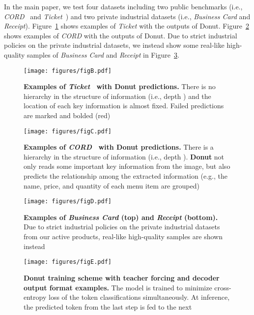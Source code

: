 \documentclass[runningheads]{llncs}
\newcommand\ours{{{\mbox{Donut}}}\xspace}
\newcommand\oursb{{\textbf{\mbox{Donut}}}\xspace}
\begin{document}
In the main paper, we test four datasets including two public benchmarks (i.e., \textit{CORD}~\cite{park2019cord} and \textit{Ticket}~\cite{eaten}) and two private industrial datasets (i.e., \textit{Business Card} and \textit{Receipt}). 
Figure~\ref{fig:ticket_example} shows examples of \textit{Ticket} with the outputs of Donut.
Figure~\ref{fig:cord_example} shows examples of \textit{CORD} with the outputs of Donut.
Due to strict industrial policies on the private industrial datasets, we instead show some real-like high-quality samples of \textit{Business Card} and \textit{Receipt} in Figure~\ref{fig:kor_jpn_example}.

\begin{figure}[t!]
    \centering
    \texttt{[image: figures/figB.pdf]}
    \caption{{\bf Examples of \textit{Ticket}~\cite{eaten} with \ours predictions.} There is no hierarchy in the structure of information (i.e., depth ) and the location of each key information is almost fixed. Failed predictions are marked and bolded (red)}
    \label{fig:ticket_example}
\end{figure}

\begin{figure}[t!]
    \centering
    \texttt{[image: figures/figC.pdf]}
    \caption{{\bf Examples of \textit{CORD}~\cite{park2019cord} with \ours predictions.} There is a hierarchy in the structure of information (i.e., depth ). \oursb not only reads some important key information from the image, but also predicts the relationship among the extracted information (e.g., the name, price, and quantity of each menu item are grouped)}
    \label{fig:cord_example}
\end{figure}

\begin{figure}[t!]
    \centering
    \texttt{[image: figures/figD.pdf]}
    \caption{{\bf Examples of \textit{Business Card} (top) and \textit{Receipt} (bottom).} Due to strict industrial policies on the private industrial datasets from our active products, real-like high-quality samples are shown instead}
    \label{fig:kor_jpn_example}
\end{figure}

\begin{figure}[t]
  \centering
  \texttt{[image: figures/figE.pdf]}
  \vspace{-6.8995mm}
  \caption{\textbf{Donut training scheme with teacher forcing and decoder output format examples.} The model is trained to minimize cross-entropy loss of the token classifications simultaneously. At inference, the predicted token from the last step is fed to the next} \label{fig:onecol}
\end{figure}
\end{document}
